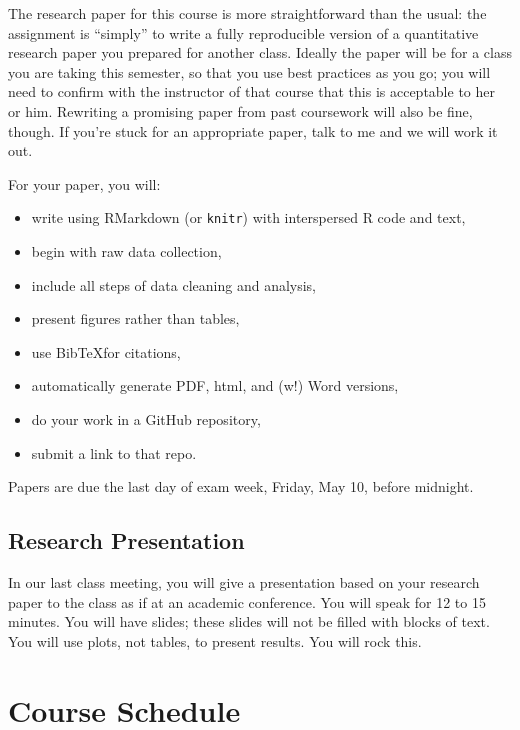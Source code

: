 \documentclass[]{article}
\providecommand{\tightlist}{%
  \setlength{\itemsep}{0pt}\setlength{\parskip}{0pt}}
\begin{document}
The research paper for this course is more straightforward than the
usual: the assignment is ``simply'' to write a fully reproducible
version of a quantitative research paper you prepared for another class.
Ideally the paper will be for a class you are taking this semester, so
that you use best practices as you go; you will need to confirm with the
instructor of that course that this is acceptable to her or him.
Rewriting a promising paper from past coursework will also be fine,
though. If you're stuck for an appropriate paper, talk to me and we will
work it out.

For your paper, you will:

\begin{itemize}
\tightlist
\item
  write using RMarkdown (or \texttt{knitr}) with interspersed \textsf{R}
  code and text,
\item
  begin with raw data collection,
\item
  include all steps of data cleaning and analysis,
\item
  present figures rather than tables,
\item
  use Bib\TeX for citations,
\item
  automatically generate PDF, html, and
  (\raisebox{0.7ex}{ee}\raisebox{0.3ex}{e}w\raisebox{-0.3ex}{ww}\raisebox{-0.7ex}{w}!)
  Word versions,
\item
  do your work in a GitHub repository,
\item
  submit a link to that repo.
\end{itemize}

Papers are due the last day of exam week, Friday, May 10, before
midnight.

\hypertarget{research-presentation}{%
\subsection{Research Presentation}\label{research-presentation}}

In our last class meeting, you will give a presentation based on your
research paper to the class as if at an academic conference. You will
speak for 12 to 15 minutes. You will have slides; these slides will not
be filled with blocks of text. You will use plots, not tables, to
present results. You will rock this.

\pagebreak

\hypertarget{course-schedule}{%
\section{Course Schedule}\label{course-schedule}}
\end{document}
